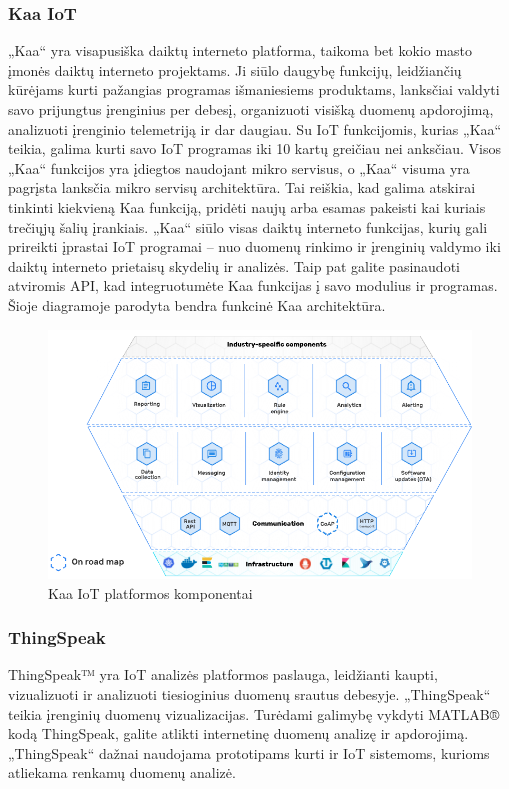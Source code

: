 \documentclass{VUMIFInfBakalaurinis}
\begin{document}
\subsubsection{Kaa IoT}
„Kaa“ yra visapusiška daiktų interneto platforma, taikoma bet kokio masto įmonės daiktų interneto projektams. Ji siūlo daugybę funkcijų, leidžiančių kūrėjams kurti pažangias programas išmaniesiems produktams,
lanksčiai valdyti savo prijungtus įrenginius per debesį, organizuoti visišką duomenų apdorojimą, analizuoti įrenginio telemetriją ir dar daugiau. Su IoT funkcijomis, kurias „Kaa“ teikia,
galima kurti savo IoT programas iki 10 kartų greičiau nei anksčiau.
Visos „Kaa“ funkcijos yra įdiegtos naudojant mikro servisus, o „Kaa“ visuma yra pagrįsta lanksčia mikro servisų architektūra.
Tai reiškia, kad galima atskirai tinkinti kiekvieną Kaa funkciją, pridėti naujų arba esamas pakeisti kai kuriais trečiųjų šalių įrankiais.
„Kaa“ siūlo visas daiktų interneto funkcijas, kurių gali prireikti įprastai IoT programai – nuo ​​duomenų rinkimo ir įrenginių valdymo iki daiktų interneto prietaisų skydelių ir analizės.
Taip pat galite pasinaudoti atviromis API, kad integruotumėte Kaa funkcijas į savo modulius ir programas.
Šioje diagramoje parodyta bendra funkcinė Kaa architektūra.

\begin{figure}[H]
  \centering
  \includegraphics[scale=0.6]{img/kaa-arch}
  \caption{Kaa IoT platformos komponentai}   %
  \label{img:mlp}
\end{figure}

\subsubsection{ThingSpeak}
ThingSpeak™ yra IoT analizės platformos paslauga, leidžianti kaupti, vizualizuoti ir analizuoti tiesioginius duomenų srautus debesyje.
„ThingSpeak“ teikia įrenginių duomenų vizualizacijas. Turėdami galimybę vykdyti MATLAB® kodą ThingSpeak, galite atlikti internetinę duomenų analizę ir apdorojimą.
„ThingSpeak“ dažnai naudojama prototipams kurti ir IoT sistemoms, kurioms atliekama renkamų duomenų analizė.
\end{document}
